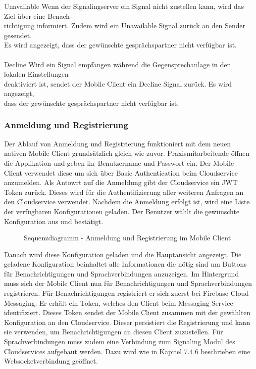 \begin{tabbing}
    Unavailable
    \> \> \> Wenn der Signalingserver ein Signal nicht zustellen kann, wird das Ziel über eine Benach-
    \\ \> \> \> richtigung informiert. Zudem wird ein Unavailable Signal zurück an den Sender gesendet.
    \\ \> \> \> Es wird angezeigt, dass der gewünschte gesprächspartner nicht verfügbar ist. \\ \\

    Decline
    \> \> \> Wird ein Signal empfangen während die Gegensprechanlage in den lokalen Einstellungen
    \\ \> \> \> deaktiviert ist, sendet der Mobile Client ein Decline Signal zurück. Es wird angezeigt,
    \\ \> \> \>  dass der gewünschte gesprächspartner nicht verfügbar ist.
\end{tabbing}

\subsubsection{Anmeldung und Registrierung}

Der Ablauf von Anmeldung und Registrierung funktioniert mit dem neuen nativen Mobile Client grundsätzlich gleich wie zuvor.
Praxismitarbeitende öffnen die Applikation und geben ihr Benutzername und Passwort ein.
Der Mobile Client verwendet diese um sich über Basic Authentication beim Cloudservice anzumelden.
Als Antowrt auf die Anmeldung gibt der Cloudservice ein JWT Token zurück.
Dieses wird für die Authentifizierung aller weiteren Anfragen an den Cloudservice verwendet.
Nachdem die Anmeldung erfolgt ist, wird eine Liste der verfügbaren Konfigurationen geladen.
Der Benutzer wählt die gewünschte Konfiguration aus und bestätigt.

\begin{figure}[h]
    \centering
    \begin{minipage}[b]{0.9\textwidth}
        \caption{Sequenzdiagramm - Anmeldung und Registrierung im Mobile Client}
    \end{minipage}
\end{figure}

Danach wird diese Konfiguration geladen und die Hauptansicht angezeigt.
Die geladene Konfiguration beinhaltet alle Informationen die nötig sind um Buttons für Benachrichtigungen und Sprachverbindungen anzuzeigen.
Im Hintergrund muss sich der Mobile Client nun für Benachrichtigungen und Sprachverbindungen registrieren.
Für Benachrichtigungen registriert er sich zuerst bei Firebase Cloud Messaging.
Er erhält ein Token, welches den Client beim Messaging Service identifiziert.
Dieses Token sendet der Mobile Client zusammen mit der gewählten Konfiguration an den Cloudservice.
Dieser persistiert die Registrierung und kann sie verwenden, um Benachrichtigungen an diesen Client zuzustellen.
Für Sprachverbindungen muss zudem eine Verbindung zum Signaling Modul des Cloudservices aufgebaut werden.
Dazu wird wie in Kapitel 7.4.6 beschrieben eine Websocketverbindung geöffnet.

